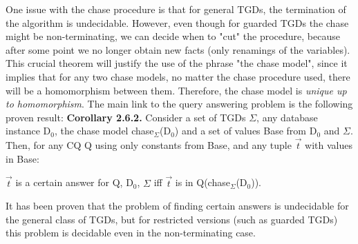 \documentclass[11pt, a4paper, dvipsnames]{article}
\begin{document}
One issue with the chase procedure is that for general TGDs, the termination of the algorithm is undecidable. However, even though for guarded TGDs the chase might be non-terminating, we can decide when to "cut" the procedure, because after some point we no longer obtain new facts (only renamings of the variables).\newline
This crucial theorem will justify the use of the phrase "the chase model", since it implies that for any two chase models, no matter the chase procedure used, there will be a homomorphism between them. Therefore, the chase model is \textit{unique up to homomorphism}. 
The main link to the query answering problem is the following proven result:\newline
\textbf{Corollary 2.6.2.} Consider a set of TGDs $\Sigma$, any database instance D$_{0}$, the chase model chase$_{\Sigma}$(D$_{0}$) and a set of values Base from D$_{0}$ and $\Sigma$. Then, for any CQ Q using only constants from Base, and any tuple $\vec{t}$ with values in Base:
\begin{center}
$\vec{t}$ is a certain answer for Q, D$_{0}$, $\Sigma$ iff $\vec{t}$ is in Q(chase$_{\Sigma}$(D$_{0}$)). 
\end{center}
It has been proven that the problem of finding certain answers is undecidable for the general class of TGDs, but for restricted versions (such as guarded TGDs) this problem is decidable even in the non-terminating case.
\end{document}
